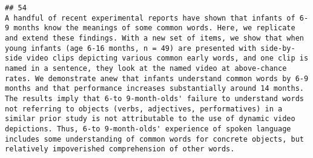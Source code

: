 \documentclass[
  english,
  man]{apa6}
\begin{document}
\begin{verbatim}
## 54                                                                                                                                                                                                                                                                                                                                                                                                                                                                                                                                                                                                                                                                                                                                                                                                                                                                                                                                                                                                                                                                                                                                                                                                                                                                                                                                                                                                                                                                                                                                                                                                                                                                                        A handful of recent experimental reports have shown that infants of 6-9 months know the meanings of some common words. Here, we replicate and extend these findings. With a new set of items, we show that when young infants (age 6-16 months, n = 49) are presented with side-by-side video clips depicting various common early words, and one clip is named in a sentence, they look at the named video at above-chance rates. We demonstrate anew that infants understand common words by 6-9 months and that performance increases substantially around 14 months. The results imply that 6-to 9-month-olds' failure to understand words not referring to objects (verbs, adjectives, performatives) in a similar prior study is not attributable to the use of dynamic video depictions. Thus, 6-to 9-month-olds' experience of spoken language includes some understanding of common words for concrete objects, but relatively impoverished comprehension of other words.

\end{verbatim}
\end{document}
